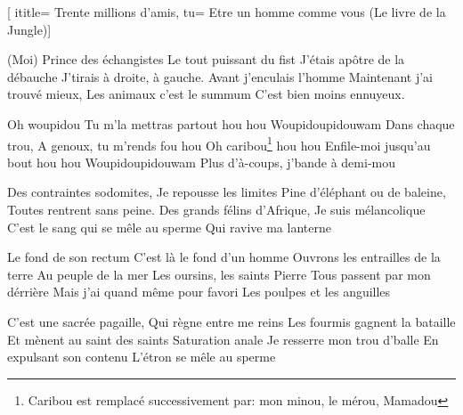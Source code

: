 [
ititle= {Trente millions d'amis},
tu= {Etre un homme comme vous (Le livre de la Jungle)}]


\beginverse
(Moi) Prince des échangistes
Le tout puissant du fist
J'étais apôtre de la débauche
J'tirais à droite, à gauche.
Avant j'enculais l'homme
Maintenant j'ai trouvé mieux,
Les animaux c'est le summum
C'est bien moins ennuyeux.
\endverse

\beginchorus
Oh woupidou
Tu m'la mettras partout hou hou
Woupidoupidouwam
Dans chaque trou,
A genoux, tu m'rends fou hou
Oh caribou\footnote {Caribou est remplacé successivement par: mon minou, le mérou, Mamadou}  hou hou
Enfile-moi jusqu'au bout hou hou
Woupidoupidouwam
Plus d'à-coups, j'bande à demi-mou
\endchorus

\beginverse
Des contraintes sodomites, 
Je repousse les limites
Pine d'éléphant ou de baleine,
Toutes rentrent sans peine.
Des grands félins d'Afrique,
Je suis mélancolique
C'est le sang qui se mêle au sperme
Qui ravive ma lanterne
\beginchorus

\beginverse
Le fond de son rectum
C'est là le fond d'un homme
Ouvrons les entrailles de la terre
Au peuple de la mer
Les oursins, les saints Pierre
Tous passent par mon dérrière
Mais j'ai quand même pour favori
Les poulpes et les anguilles
\beginchorus

\beginverse
C'est une sacrée pagaille,
Qui règne entre me reins
Les fourmis gagnent la bataille
Et mènent au saint des saints
Saturation anale
Je resserre mon trou d'balle
En expulsant son contenu
L'étron se mêle au sperme
\beginchorus

\endsong